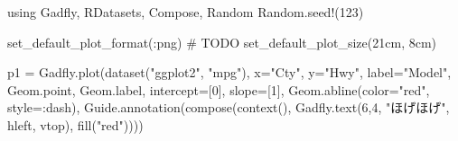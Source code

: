 \documentclass[
  letterpaper,
  DIV=11,
  pandoc,
  ja=standard,
  jafont=haranoaji]{bxjsarticle}
\newenvironment{Shaded}{\begin{snugshade}}{\end{snugshade}}
\newcommand{\AlertTok}[1]{\textcolor[rgb]{0.68,0.00,0.00}{#1}}
\newcommand{\BuiltInTok}[1]{\textcolor[rgb]{0.00,0.48,0.65}{#1}}
\newcommand{\CommentTok}[1]{\textcolor[rgb]{0.37,0.37,0.37}{#1}}
\newcommand{\FloatTok}[1]{\textcolor[rgb]{0.68,0.00,0.00}{#1}}
\newcommand{\FunctionTok}[1]{\textcolor[rgb]{0.28,0.35,0.67}{#1}}
\newcommand{\KeywordTok}[1]{\textcolor[rgb]{0.00,0.48,0.65}{#1}}
\newcommand{\NormalTok}[1]{\textcolor[rgb]{0.00,0.48,0.65}{#1}}
\newcommand{\OperatorTok}[1]{\textcolor[rgb]{0.37,0.37,0.37}{#1}}
\newcommand{\StringTok}[1]{\textcolor[rgb]{0.13,0.47,0.30}{#1}}
\begin{document}
\begin{Shaded}
\begin{Highlighting}[]
\KeywordTok{using}\NormalTok{ Gadfly}\OperatorTok{,}\NormalTok{ RDatasets}\OperatorTok{,}\NormalTok{ Compose}\OperatorTok{,} \BuiltInTok{Random}
\BuiltInTok{Random}\NormalTok{.}\FunctionTok{seed!}\NormalTok{(}\FloatTok{123}\NormalTok{)}

\FunctionTok{set\_default\_plot\_format}\NormalTok{(}\OperatorTok{:}\NormalTok{png)  }\CommentTok{\# }\AlertTok{TODO}
\FunctionTok{set\_default\_plot\_size}\NormalTok{(}\FloatTok{21}\NormalTok{cm}\OperatorTok{,} \FloatTok{8}\NormalTok{cm)}

\NormalTok{p1 }\OperatorTok{=}\NormalTok{ Gadfly.}\FunctionTok{plot}\NormalTok{(}\FunctionTok{dataset}\NormalTok{(}\StringTok{"ggplot2"}\OperatorTok{,} \StringTok{"mpg"}\NormalTok{)}\OperatorTok{,}
\NormalTok{     x}\OperatorTok{=}\StringTok{"Cty"}\OperatorTok{,}\NormalTok{ y}\OperatorTok{=}\StringTok{"Hwy"}\OperatorTok{,}\NormalTok{ label}\OperatorTok{=}\StringTok{"Model"}\OperatorTok{,}\NormalTok{ Geom.point}\OperatorTok{,}\NormalTok{ Geom.label}\OperatorTok{,}
\NormalTok{     intercept}\OperatorTok{=}\NormalTok{[}\FloatTok{0}\NormalTok{]}\OperatorTok{,}\NormalTok{ slope}\OperatorTok{=}\NormalTok{[}\FloatTok{1}\NormalTok{]}\OperatorTok{,}\NormalTok{ Geom.}\FunctionTok{abline}\NormalTok{(color}\OperatorTok{=}\StringTok{"red"}\OperatorTok{,}\NormalTok{ style}\OperatorTok{=:}\NormalTok{dash)}\OperatorTok{,}
\NormalTok{     Guide.}\FunctionTok{annotation}\NormalTok{(}\FunctionTok{compose}\NormalTok{(}\FunctionTok{context}\NormalTok{()}\OperatorTok{,}\NormalTok{ Gadfly.}\FunctionTok{text}\NormalTok{(}\FloatTok{6}\OperatorTok{,}\FloatTok{4}\OperatorTok{,} \StringTok{"ほげほげ"}\OperatorTok{,}\NormalTok{ hleft}\OperatorTok{,}\NormalTok{ vtop)}\OperatorTok{,} \FunctionTok{fill}\NormalTok{(}\StringTok{"red"}\NormalTok{))))}


\end{Highlighting}
\end{Shaded}
\end{document}

